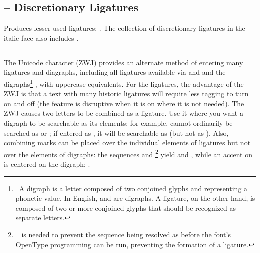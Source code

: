\subsection{ –
Discretionary Ligatures}
Produces lesser-used ligatures:
.
The collection of discretionary ligatures in the italic face also includes
.


\subsection{ }\hypertarget{zwj}{}

The Unicode character  
 (ZWJ) provides an
alternate method of entering many ligatures and diagraphs, including all ligatures
available via  and  and the 
digraphs\footnote{\ A digraph is a letter composed of two conjoined glyphs and
representing a phonetic value. In English,  and  are digraphs.
A ligature, on the other hand, is composed of two or more conjoined glyphs that
should be recognized as separate letters.}
, with uppercase equivalents. For the ligatures,
the advantage of the ZWJ is that a text with many historic
ligatures will require less tagging to turn  on and off (the
feature is disruptive when it is on where it is not needed). The ZWJ causes two
letters to be combined as a ligature.  Use it where you want a digraph to be searchable
as its elements: for example,   cannot
ordinarily be searched as  or ; if entered as , it will be searchable as  (but not as ).
Also, combining marks can be placed over the individual elements of ligatures but not
over the elements of digraphs: the sequences  and \footnote{\ \hyperlink{cgj}{}  is needed to
prevent the sequence  being resolved as 
before the font’s OpenType programming can be run, preventing the formation of a
ligature.} yield  and
, while an accent on  is
centered on the digraph: .


